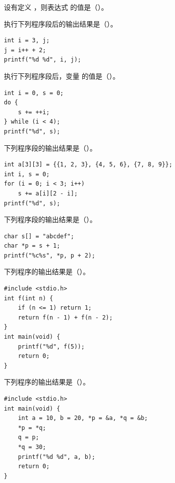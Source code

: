 \documentclass[a4paper,11pt]{article}
\begin{document}


\begin{qgroup}
\q 设有定义 ，则表达式  的值是（\quad）。

\q 执行下列程序段后的输出结果是（\quad）。
\begin{lstlisting}[language={[custom]C}]
int i = 3, j;
j = i++ + 2;
printf("%d %d", i, j);
\end{lstlisting}

\q 执行下列程序段后，变量  的值是（\quad）。
\begin{lstlisting}[language={[custom]C}]
int i = 0, s = 0;
do {
    s += ++i;
} while (i < 4);
printf("%d", s);
\end{lstlisting}

\q 下列程序段的输出结果是（\quad）。
\begin{lstlisting}[language={[custom]C}]
int a[3][3] = {{1, 2, 3}, {4, 5, 6}, {7, 8, 9}};
int i, s = 0;
for (i = 0; i < 3; i++)
    s += a[i][2 - i];
printf("%d", s);
\end{lstlisting}

\q 下列程序段的输出结果是（\quad）。
\begin{lstlisting}[language={[custom]C}]
char s[] = "abcdef";
char *p = s + 1;
printf("%c%s", *p, p + 2);
\end{lstlisting}

\q 下列程序的输出结果是（\quad）。
\begin{lstlisting}[language={[custom]C}]
#include <stdio.h>
int f(int n) {
    if (n <= 1) return 1;
    return f(n - 1) + f(n - 2);
}
int main(void) {
    printf("%d", f(5));
    return 0;
}
\end{lstlisting}

\q 下列程序的输出结果是（\quad）。
\begin{lstlisting}[language={[custom]C}]
#include <stdio.h>
int main(void) {
    int a = 10, b = 20, *p = &a, *q = &b;
    *p = *q;
    q = p;
    *q = 30;
    printf("%d %d", a, b);
    return 0;
}
\end{lstlisting}


\end{qgroup}
\end{document}
